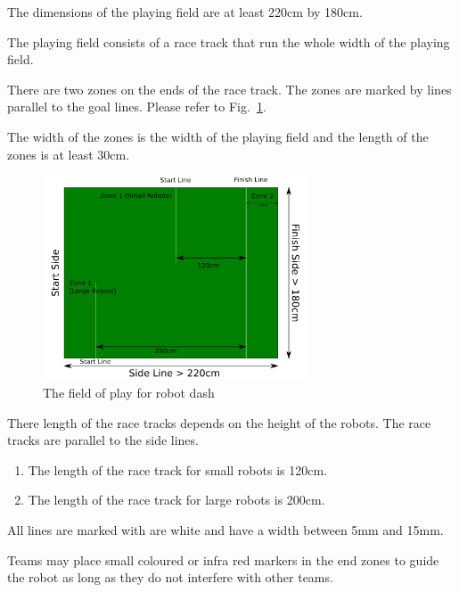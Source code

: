 \documentclass[12pt]{hurocup}
\begin{document}
\begin{lawlist}[RD]

\item The dimensions of the playing field are at least 220cm by
  180cm. 
  
\item The playing field consists of a race track that run the whole
  width of the playing field.

\item There are two zones on the ends of the race track. The zones are
  marked by lines parallel to the goal lines. Please refer to
  Fig.~\ref{fig:robot-dash}.

\item The width of the zones is the width of the playing field and the
  length of the zones is at least 30cm.
  \begin{figure}
    \begin{center}
      \includegraphics[width=0.7\textwidth]{Figures/robot-dash}
    \end{center}
    \caption{The field of play for robot dash}
    \label{fig:robot-dash}
  \end{figure}
  
\item There length of the race tracks depends on the height of the
  robots. The race tracks are parallel to the side lines.
  \begin{enumerate}
  \item The length of the race track for small robots
    is 120cm.
  \item The length of the race track for large robots
    is 200cm.
  \end{enumerate}

\item All lines are marked with are white and have a width between 5mm
  and 15mm.
  
\item Teams may place small coloured or infra red markers in the end
  zones to guide the robot as long as they do not interfere with other
  teams.
\end{lawlist}
\end{document}
